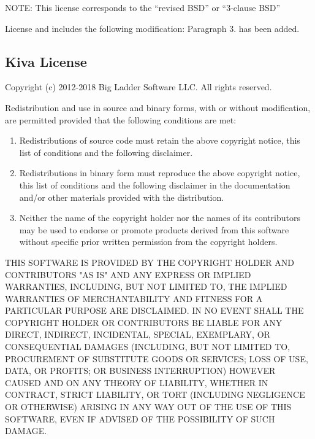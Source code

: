 NOTE: This license corresponds to the ``revised BSD'' or ``3-clause BSD''

License and includes the following modification: Paragraph 3. has been added.

\subsection{Kiva License}\label{kiva-license}

Copyright (c) 2012-2018 Big Ladder Software LLC. All rights reserved.

Redistribution and use in source and binary forms, with or without
modification, are permitted provided that the following conditions are met:

\begin{enumerate}
\def\labelenumi{(\arabic{enumi})}
\item
Redistributions of source code must retain the above copyright notice, this
list of conditions and the following disclaimer.
\item
Redistributions in binary form must reproduce the above copyright notice,
this list of conditions and the following disclaimer in the documentation
and/or other materials provided with the distribution.
\item
Neither the name of the copyright holder nor the names of its contributors
may be used to endorse or promote products derived from this software without
specific prior written permission from the copyright holders.
\end{enumerate}

THIS SOFTWARE IS PROVIDED BY THE COPYRIGHT HOLDER AND CONTRIBUTORS "AS IS"
AND ANY EXPRESS OR IMPLIED WARRANTIES, INCLUDING, BUT NOT LIMITED TO, THE
IMPLIED WARRANTIES OF MERCHANTABILITY AND FITNESS FOR A PARTICULAR PURPOSE ARE
DISCLAIMED. IN NO EVENT SHALL THE COPYRIGHT HOLDER OR CONTRIBUTORS BE LIABLE
FOR ANY DIRECT, INDIRECT, INCIDENTAL, SPECIAL, EXEMPLARY, OR CONSEQUENTIAL
DAMAGES (INCLUDING, BUT NOT LIMITED TO, PROCUREMENT OF SUBSTITUTE GOODS OR
SERVICES; LOSS OF USE, DATA, OR PROFITS; OR BUSINESS INTERRUPTION) HOWEVER
CAUSED AND ON ANY THEORY OF LIABILITY, WHETHER IN CONTRACT, STRICT LIABILITY,
OR TORT (INCLUDING NEGLIGENCE OR OTHERWISE) ARISING IN ANY WAY OUT OF THE USE
OF THIS SOFTWARE, EVEN IF ADVISED OF THE POSSIBILITY OF SUCH DAMAGE.
